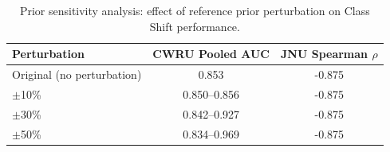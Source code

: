 \begin{table}[!t]
\centering
\footnotesize
\caption{Prior sensitivity analysis: effect of reference prior perturbation on Class Shift performance.}
\label{tab:prior_sensitivity}
\begin{tabular}{lcc}
\toprule
Perturbation & CWRU Pooled AUC & JNU Spearman $\rho$ \\
\midrule
Original (no perturbation) & 0.853 & -0.875 \\
$\pm$10\% & 0.850--0.856 & -0.875 \\
$\pm$30\% & 0.842--0.927 & -0.875 \\
$\pm$50\% & 0.834--0.969 & -0.875 \\
\bottomrule
\end{tabular}
\end{table}
